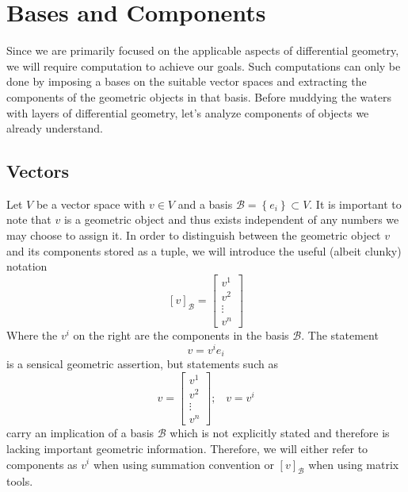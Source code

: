 \documentclass[a4paper]{article}
\begin{document}
\section*{Bases and Components}%
Since we are primarily focused on the applicable aspects of differential geometry, we will require computation to achieve our goals. Such computations can only be done by imposing a bases on the suitable vector spaces and extracting the components of the geometric objects in that basis. Before muddying the waters with layers of differential geometry, let's analyze components of objects we already understand.

\subsection*{Vectors}%
Let $V$ be a vector space with $v \in V$ and a basis $\mathcal{B} = \left\{ e_i\right\} \subset V$. It is important to note that $v$ is a geometric object and thus exists independent of any numbers we may choose to assign it. In order to distinguish between the geometric object $v$ and its components stored as a tuple, we will introduce the useful (albeit clunky) notation
\[
  \left[ v \right]_{\mathcal{B}} = 
  \begin{bmatrix}
    v^1 \\
    v^2  \\
    \vdots \\
    v^n
  \end{bmatrix}
\]
Where the $v^i$ on the right are the components in the basis $\mathcal{B}$. The statement
\[
  v = v^i e_i
\]
is a sensical geometric assertion, but statements such as
\[
  v = 
  \begin{bmatrix}
    v^1 \\
    v^2  \\
    \vdots \\
    v^n
  \end{bmatrix}\text{;}
  \quad
  v = v^i
\]
carry an implication of a basis $\mathcal{B}$ which is not explicitly stated and therefore is lacking important geometric information. Therefore, we will either refer to components as $v^i$ when using summation convention or $ \left[ v \right]_{\mathcal{B}}$ when using matrix tools. 
\end{document}
